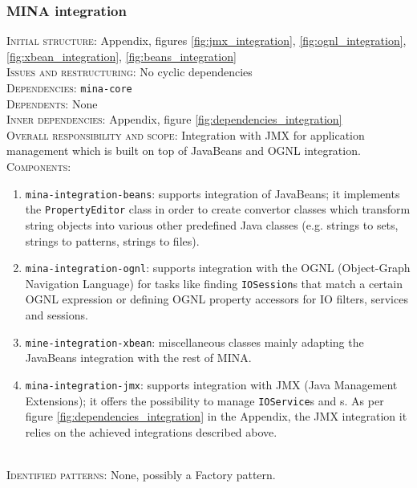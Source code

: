 \subsubsection{MINA integration}
\textsc{Initial structure}: Appendix, figures \ref{fig:jmx_integration}, \ref{fig:ognl_integration}, \ref{fig:xbean_integration}, \ref{fig:beans_integration} \\
\textsc{Issues and restructuring}: No cyclic dependencies\\
\textsc{Dependencies}: \texttt{mina-core}\\
\textsc{Dependents}: None\\
\textsc{Inner dependencies}: Appendix, figure \ref{fig:dependencies_integration}\\
\textsc{Overall responsibility and scope}: Integration with JMX for application management which is built on top of JavaBeans and OGNL integration.\\
\textsc{Components}:
\begin{enumerate}
    \item \texttt{mina-integration-beans}: supports integration of JavaBeans; it implements the \texttt{PropertyEditor} class in order to create convertor classes which transform string objects into various other predefined Java classes (e.g. strings to sets, strings to patterns, strings to files).
    \item \texttt{mina-integration-ognl}: supports integration with the OGNL (Object-Graph Navigation Language) for tasks like finding \texttt{IOSession}s that match a certain OGNL expression or defining OGNL property accessors for IO filters, services and sessions.
    \item \texttt{mine-integration-xbean}: miscellaneous classes mainly adapting the JavaBeans integration with the rest of MINA. 
    \item \texttt{mina-integration-jmx}: supports integration with JMX (Java Management Extensions); it offers the possibility to manage \texttt{IOService}s and s. As per figure \ref{fig:dependencies_integration} in the Appendix, the JMX integration it relies on the achieved integrations described above.
\end{enumerate}\\
\textsc{Identified patterns}: None, possibly a Factory pattern.

